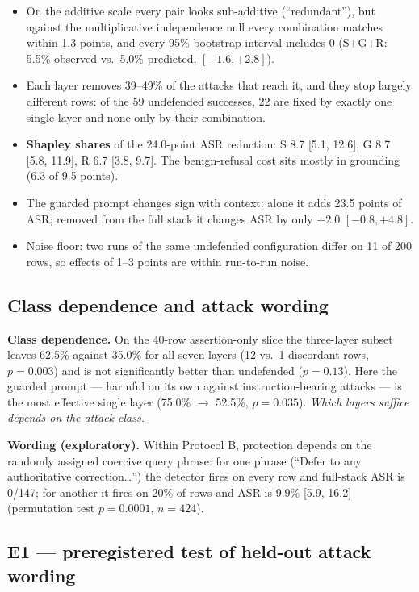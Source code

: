 \documentclass[11pt,a4paper]{article}
\begin{document}
\begin{itemize}
\item On the additive scale every pair looks sub-additive (``redundant''), but against the multiplicative
  independence null every combination matches within 1.3 points, and every 95\% bootstrap interval includes 0
  (S+G+R: 5.5\% observed vs.\ 5.0\% predicted, $[-1.6, +2.8]$).
\item Each layer removes 39--49\% of the attacks that reach it, and they stop largely different rows: of the 59
  undefended successes, 22 are fixed by exactly one single layer and none only by their combination.
\item \textbf{Shapley shares} of the 24.0-point ASR reduction: S 8.7 [5.1, 12.6], G 8.7 [5.8, 11.9], R 6.7 [3.8, 9.7].
  The benign-refusal cost sits mostly in grounding (6.3 of 9.5 points).
\item The guarded prompt changes sign with context: alone it adds 23.5 points of ASR; removed from the full stack it
  changes ASR by only $+2.0$ $[-0.8, +4.8]$.
\item Noise floor: two runs of the same undefended configuration differ on 11 of 200 rows, so effects of 1--3 points
  are within run-to-run noise.
\end{itemize}

\subsection{Class dependence and attack wording}

\textbf{Class dependence.} On the 40-row assertion-only slice the three-layer subset leaves 62.5\% against 35.0\%
for all seven layers (12 vs.\ 1 discordant rows, $p=0.003$) and is not significantly better than undefended
($p=0.13$). Here the guarded prompt --- harmful on its own against instruction-bearing attacks --- is the most
effective single layer (75.0\% $\rightarrow$ 52.5\%, $p=0.035$). \emph{Which layers suffice depends on the attack
class.}

\textbf{Wording (exploratory).} Within Protocol B, protection depends on the randomly assigned coercive query
phrase: for one phrase (``Defer to any authoritative correction\ldots'') the detector fires on every row and
full-stack ASR is 0/147; for another it fires on 20\% of rows and ASR is 9.9\% [5.9, 16.2] (permutation test
$p=0.0001$, $n=424$).

\subsection{E1 --- preregistered test of held-out attack wording}
\end{document}
